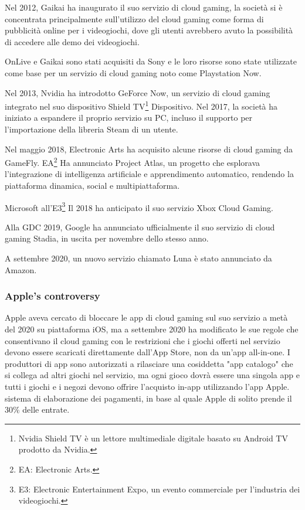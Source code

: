 Nel 2012, Gaikai ha inaugurato il suo servizio di cloud gaming, la società si è concentrata principalmente sull'utilizzo del cloud gaming come forma di pubblicità online per i videogiochi, dove gli utenti avrebbero avuto la possibilità di accedere alle demo dei videogiochi.

OnLive e Gaikai sono stati acquisiti da Sony e le loro risorse sono state utilizzate come base per un servizio di cloud gaming noto come Playstation Now.

Nel 2013, Nvidia ha introdotto GeForce Now, un servizio di cloud gaming integrato nel suo dispositivo Shield TV\footnote{Nvidia Shield TV è un lettore multimediale digitale basato su Android TV prodotto da Nvidia.} Dispositivo. Nel 2017, la società ha iniziato a espandere il proprio servizio su PC, incluso il supporto per l'importazione della libreria Steam di un utente.

Nel maggio 2018, Electronic Arts ha acquisito alcune risorse di cloud gaming da GameFly. EA\footnote{EA: Electronic Arts.} Ha annunciato Project Atlas, un progetto che esplorava l'integrazione di intelligenza artificiale e apprendimento automatico, rendendo la piattaforma dinamica, social e multipiattaforma.

Microsoft all'E3\footnote{E3: Electronic Entertainment Expo, un evento commerciale per l'industria dei videogiochi.} Il 2018 ha anticipato il suo servizio Xbox Cloud Gaming.

Alla GDC 2019, Google ha annunciato ufficialmente il suo servizio di cloud gaming Stadia, in uscita per novembre dello stesso anno.

A settembre 2020, un nuovo servizio chiamato Luna è stato annunciato da Amazon\cite{Cloud_gaming_history}.

\subsubsection{Apple's controversy}
Apple aveva cercato di bloccare le app di cloud gaming sul suo servizio a metà del 2020 su piattaforma iOS, ma a settembre 2020 ha modificato le sue regole che consentivano il cloud gaming con le restrizioni che i giochi offerti nel servizio devono essere scaricati direttamente dall'App Store, non da un'app all-in-one. I produttori di app sono autorizzati a rilasciare una cosiddetta "app catalogo" che si collega ad altri giochi nel servizio, ma ogni gioco dovrà essere una singola app e tutti i giochi e i negozi devono offrire l'acquisto in-app utilizzando l'app Apple. sistema di elaborazione dei pagamenti, in base al quale Apple di solito prende il 30\% delle entrate\cite{Apple_controversy}.

